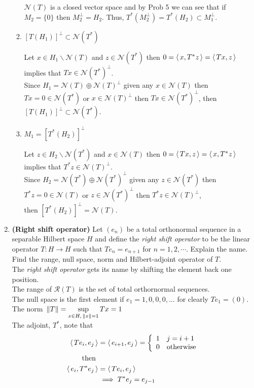 \documentclass[10pt,a4paper]{report}
\newcommand{\NLL}{\mathcal{N}}
\newcommand{\NORM}[1]{\,\left \Vert #1 \right \Vert}
\begin{document}
\begin{enumerate}
\begin{enumerate}
		$\mathcal{N}(T)$ is a closed vector space and by Prob 5 we can see that if $M_2=\{0\}$ then $M_2^\perp = H_2$.  Thus, $T^*(M_2^\perp)=T^*(H_2)\subset M_1^\perp$.
		
		\item $[T(H_1)]^\perp \subset \mathcal{N}(T^*)$
		
		Let $x \in H_1 \backslash \NLL(T)$ and $z \in \NLL(T^*)$ then $0=\left \langle\, x, T^*z \,\right \rangle=\left \langle\, Tx, z \,\right \rangle$ implies that $Tx \in \NLL(T^*)^\perp$.\\
		Since $H_1=\NLL(T)\oplus \NLL(T)^\perp$ given any $x \in \NLL(T)$ then $Tx = 0 \in \NLL(T^*)$ or $x \in \NLL(T)^\perp$ then $Tx\in \NLL(T^*)^\perp$, then $[T(H_1)]^\perp \subset \NLL(T^*)$.
		
		\item $M_1=[T^*(H_2)]^\perp$
		
		Let $z \in H_2\backslash \NLL(T^*)$ and $x \in \NLL(T)$ then $0 = \left \langle\, Tx, z \,\right \rangle= \left \langle\, x, T^*z \,\right \rangle$ implies that $T^*z \in \NLL(T)^\perp$.\\
		Since $H_2 = \NLL(T^*)\oplus \NLL(T^*)^\perp$ given any $z\in \NLL(T^*)$ then $T^*z = 0 \in \NLL(T)$ or $z \in \NLL(T^*)^\perp$ then $T^*z \in \NLL(T)^\perp$,\\
		then $[T^*(H_2)]^\perp = \NLL(T)$.
	\end{enumerate}
	\setcounter{enumi}{9}
	\item \textbf{(Right shift operator)} Let $(e_n)$ be a total orthonormal sequence in a separable Hilbert space $H$ and define the \textit{right shift operator} to be the linear operator $T: H \to H$ such that $Te_n=e_{n+1}$ for $n=1,2,\cdots$.  Explain the name.  Find the range, null space, norm and Hilbert-adjoint operator of $T$.\\
	
	The \textit{right shift operator} gets its name by shifting the element back one position.\\
	The range of $\mathcal{R}(T)$ is the set of total orthornormal sequences.\\
	The null space is the first element if $e_1 = 1, 0, 0, 0, \dots $ for clearly $Te_1 = (0)$.  \\
	The norm $\NORM{T} = \SUP{x \in H, \NORM{x}=1} Tx = 1$\\
	The adjoint, $T^*$, note that 
	\begin{align*}
		\left \langle\, Te_i, e_j \,\right \rangle &= \left \langle\, e_{i+1}, e_j \,\right \rangle = \left \{ \begin{array}{ll}  1 & j = i+1 \\ 0 & \text{otherwise} \end{array} \right . \\
		\text{ then }&\\
		\left \langle\, e_i, T^*e_j \,\right \rangle &= \left \langle\, Te_i, e_j \,\right \rangle \\
		& \implies T^*e_j = e_{j-1}
	\end{align*}

\end{enumerate}
\end{document}
